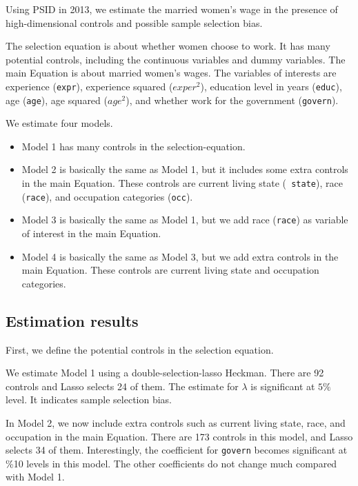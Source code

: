 

Using PSID in 2013, we estimate the married women's wage in the presence of
high-dimensional controls and possible sample selection bias.  

The selection equation is about whether women choose to work. It has many 
potential controls, including the continuous variables and dummy variables.
The main Equation is about married women's wages. The variables of interests
are experience ({\tt expr}), experience squared ({\tt $exper^2$}), education
level in years ({\tt educ}), age ({\tt age}), age squared ({\tt $age^2$}), and
whether work for the government ({\tt govern}).

We estimate four models. 
\begin{itemize}
\item Model 1 has many controls in the selection-equation.  

\item Model 2 is basically the same as Model 1, but it includes some extra
controls in the main Equation. These controls are current living state ({\tt
state}), race ({\tt race}), and occupation categories ({\tt occ}). 

\item Model 3 is basically the same as Model 1, but we add race ({\tt race}) as
variable of interest in the main Equation.

\item Model 4 is basically the same as Model 3, but we add extra controls in the
main Equation. These controls are current living state and occupation
categories.
\end{itemize}


\subsection{Estimation results}
First, we define the potential controls in the selection equation.
\begin{stlog}

\end{stlog}

We estimate Model 1 using a double-selection-lasso Heckman. There are 92
controls and Lasso selects 24 of them.  The estimate for $\lambda$ is
significant at $5\%$ level.  It indicates sample selection bias.

\begin{stlog}

\end{stlog}

In Model 2, we now include extra controls such as current living state, race,
and occupation in the main Equation. There are 173 controls in this model, and
Lasso selects 34 of them. Interestingly, the coefficient for {\tt govern}
becomes significant at \%10 levels in this model. The other coefficients do not
change much compared with Model 1.
\begin{stlog}

\end{stlog}

